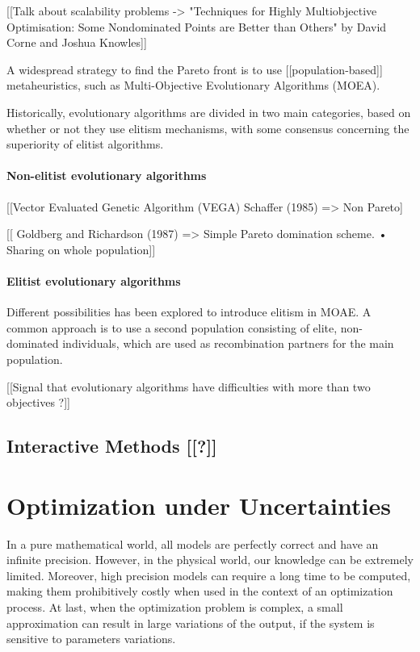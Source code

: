 [[Talk about scalability problems -> "Techniques for Highly Multiobjective Optimisation: Some Nondominated Points are Better than Others" by David Corne and Joshua Knowles]]


A widespread strategy to find the Pareto front is to use [[population-based]] metaheuristics, such as Multi-Objective Evolutionary Algorithms (MOEA). 

Historically, evolutionary algorithms are divided in two main categories, based on whether or not they use elitism mechanisms, with some consensus concerning the superiority of elitist algorithms.

\subsubsection{Non-elitist evolutionary algorithms}

[[Vector Evaluated Genetic Algorithm (VEGA) Schaffer (1985) => Non Pareto]

[[  Goldberg and Richardson (1987) =>  Simple Pareto domination scheme. • Sharing on whole population]]


\subsubsection{Elitist evolutionary algorithms}

Different possibilities has been explored to introduce elitism in MOAE. A common approach is to use a second population consisting of elite, non-dominated individuals, which are used as recombination partners for the main population.

[[Signal that evolutionary algorithms have difficulties with more than two objectives ?]]

\section{Interactive Methods [[?]]}

\chapter{Optimization under Uncertainties}

In a pure mathematical world, all models are perfectly correct and have an infinite precision. However, in the physical world, our knowledge can be extremely limited. Moreover, high precision models can require a long time to be computed, making them prohibitively costly when used in the context of an optimization process. At last, when the optimization problem is complex, a small approximation can result in large variations of the output, if the system is sensitive to parameters variations.

